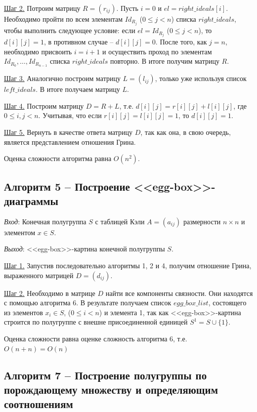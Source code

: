 \documentclass[bachelor, och, labwork]{shiza}
\begin{document}
    \underline{Шаг 2.}  Потроим матрицу $R = (r_{ij})$. Пусть $i = 0$ и $el = right\_ideals[i]$. Необходимо пройти по всем элементам $Id_{R_j}$ ($0 \leq j < n$)
    списка $right\_ideals$, чтобы выполнить следующее условие: если $el = Id_{R_j}$ ($0 \leq j < n$), то $d[i][j] = 1$, в противном случае -- $d[i][j] = 0$.
    После того, как $j = n$, необходимо присвоить $i = i + 1$ и осуществить проход по элементам $Id_{R_0}, \dots, Id_{R_{n-1}}$ списка $right\_ideals$ повторно.
    В итоге получим матрицу $R$.
    
    \underline{Шаг 3.} Аналогично построим матрицу $L = (l_{ij})$, только уже используя список $left\_ideals$. В итоге получаем матрицу $L$.

    \underline{Шаг 4.} Построим матрицу $D = R + L$, т.е. $d[i][j] = r[i][j] + l[i][j]$, где $0 \leq i, j < n$. Учитывая, что если $r[i][j] = l[i][j] = 1$,
    то $d[i][j] = 1$.

    \underline{Шаг 5.} Вернуть в качестве ответа матрицу $D$, так как она, в свою очередь, является представлением отношения Грина.
    
      Оценка сложности алгоритма равна $O(n^2)$.


    \subsection{Алгоритм 5 -- Построение <<egg-box>>-диаграммы}

      \textit{Вход}: Конечная полугруппа $S$ с таблицей Кэли $A = (a_{ij})$ размерности $n \times n$ и элементом $x \in S$.

      \textit{Выход}: <<egg-box>>-картина конечной полугруппы $S$.
      
      \underline{Шаг 1.} Запустив последовательно алгоритмы 1, 2 и 4, получим отношение Грина, выраженного матрицей $D = (d_{ij})$.

      \underline{Шаг 2.} Необходимо в матрице $D$ найти все компоненты связности. Они находятся с помощью алгоритма 6. В результате получаем
      список $egg\_box\_list$, состоящего из элементов $x_i \in S$, ($0 \leq i < n$) и элемента 1, так как <<egg-box>>-картина строится по полугруппе
      с внешне присоединенной единицей $S^1 = S \cup \{1\}$.

      Оценка сложности равна оценке сложность алгоритма 6, т.е. $O(n + n) = O(n)$



      \subsection{Алгоритм 7 -- Построение полугруппы по порождающему множеству и определяющим соотношениям}
\end{document}
